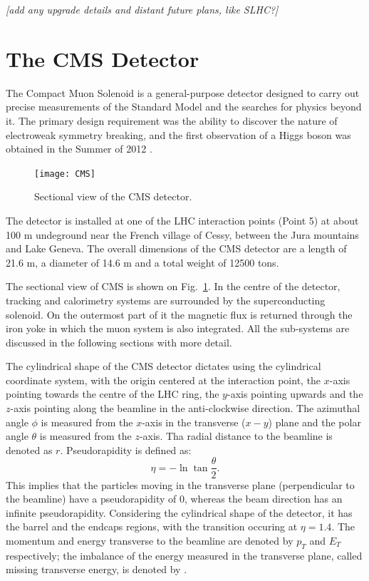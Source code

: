 \textit{[add any upgrade details and distant future plans, like SLHC?]}

\section{The CMS Detector}
The Compact Muon Solenoid \cite{CMS} is a general-purpose detector designed to carry out precise measurements of the
Standard Model and the searches for physics beyond it. The primary design requirement was the ability to
discover the nature of electroweak symmetry breaking, and the first observation of a Higgs boson was obtained in the
Summer of 2012 \cite{CMS_Higgs}.

\begin{figure}[htbp]
  \begin{center}
    \leavevmode
    \texttt{[image: CMS]}
    \caption{Sectional view of the CMS detector.}
    \label{CMS}
  \end{center}
\end{figure}

The detector is installed at one of the LHC interaction points (Point 5) at about 100 m undeground near the French
village of Cessy, between the Jura mountains and Lake Geneva. The overall dimensions of the CMS detector are a length of
21.6 m, a diameter of 14.6 m and a total weight of 12500 tons.

The sectional view of CMS is shown on Fig.~\ref{CMS}. In the centre of the detector, tracking and calorimetry systems
are surrounded by the superconducting solenoid. On the outermost part of it the magnetic flux is returned through the
iron yoke in which the muon system is also integrated. All the sub-systems are discussed in the following sections with
more detail.

The cylindrical shape of the CMS detector dictates using the cylindrical coordinate system, with the origin centered at
the interaction point, the $x$-axis pointing towards the centre of the LHC ring, the $y$-axis pointing upwards and the
$z$-axis pointing along the beamline in the anti-clockwise direction. The azimuthal angle $\phi$ is measured from the
$x$-axis in the transverse ($x-y$) plane and the polar angle $\theta$ is measured from the $z$-axis. Tha radial distance
to the beamline is denoted as $r$. Pseudorapidity is defined as:
\begin{equation}
  \eta = - \ln{\tan{\frac{\theta}{2}}}.
\end{equation}
This implies that the particles moving in the transverse plane (perpendicular to the beamline) have a pseudorapidity of
0, whereas the beam direction has an infinite pseudorapidity. Considering the cylindrical shape of the detector, it has
the barrel and the endcaps regions, with the transition occuring at $\eta = 1.4$. The momentum and energy transverse to
the beamline are denoted by $p_T$ and $E_T$ respectively; the imbalance of the energy measured in the transverse plane,
called missing transverse energy, is denoted by \ETm.

